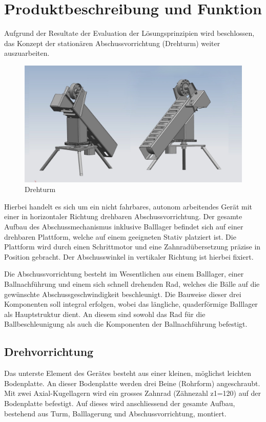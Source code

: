 \section{Produktbeschreibung und Funktion}
\label{sec:prodbeschr}
Aufgrund der Resultate der Evaluation der Lösungsprinzipien wird beschlossen, 
das Konzept der stationären Abschussvorrichtung (Drehturm) weiter 
auszuarbeiten. 
\begin{figure}[h!]          
	\centering             
	\includegraphics[width=1.0\textwidth]{fig/Gesamt_bg.jpg}    
	\caption{Drehturm}
	\label{fig:bild} 
\end{figure}

Hierbei handelt es sich um ein nicht fahrbares, autonom arbeitendes Gerät mit 
einer in horizontaler Richtung drehbaren Abschussvorrichtung. Der gesamte Aufbau 
des Abschussmechanismus inklusive Balllager befindet sich auf einer drehbaren 
Plattform, welche auf einem geeigneten Stativ platziert ist. Die Plattform 
wird durch einen Schrittmotor und eine Zahnradübersetzung präzise in Position 
gebracht. Der Abschusswinkel in vertikaler Richtung ist hierbei fixiert. 

Die Abschussvorrichtung besteht im Wesentlichen aus einem Balllager, einer 
Ballnachführung und einem sich schnell drehenden Rad, welches die Bälle auf 
die gewünschte Abschussgeschwindigkeit beschleunigt. Die Bauweise dieser drei 
Komponenten soll integral erfolgen, wobei das längliche, quaderförmige 
Balllager als Hauptstruktur dient. An diesem sind sowohl das Rad für die 
Ballbeschleunigung als auch die Komponenten der Ballnachführung befestigt.

\subsection{Drehvorrichtung}
Das unterste Element des Gerätes besteht aus einer kleinen, möglichst leichten 
Bodenplatte. An dieser Bodenplatte werden drei Beine (Rohrform) angeschraubt. Mit 
zwei Axial-Kugellagern wird ein grosses Zahnrad (Zähnezahl z1=120) auf der Bodenplatte 
befestigt. Auf dieses wird anschliessend der gesamte Aufbau, bestehend aus 
Turm, Balllagerung und Abschussvorrichtung, montiert. 


